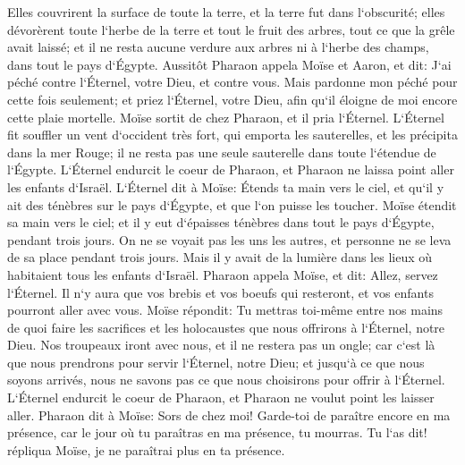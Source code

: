 \verse Elles couvrirent la surface de toute la terre, et la terre fut dans l`obscurité; elles dévorèrent toute l`herbe de la terre et tout le fruit des arbres, tout ce que la grêle avait laissé; et il ne resta aucune verdure aux arbres ni à l`herbe des champs, dans tout le pays d`Égypte. 
\verse Aussitôt Pharaon appela Moïse et Aaron, et dit: J`ai péché contre l`Éternel, votre Dieu, et contre vous. 
\verse Mais pardonne mon péché pour cette fois seulement; et priez l`Éternel, votre Dieu, afin qu`il éloigne de moi encore cette plaie mortelle. 
\verse Moïse sortit de chez Pharaon, et il pria l`Éternel. 
\verse L`Éternel fit souffler un vent d`occident très fort, qui emporta les sauterelles, et les précipita dans la mer Rouge; il ne resta pas une seule sauterelle dans toute l`étendue de l`Égypte. 
\verse L`Éternel endurcit le coeur de Pharaon, et Pharaon ne laissa point aller les enfants d`Israël. 
\verse L`Éternel dit à Moïse: Étends ta main vers le ciel, et qu`il y ait des ténèbres sur le pays d`Égypte, et que l`on puisse les toucher. 
\verse Moïse étendit sa main vers le ciel; et il y eut d`épaisses ténèbres dans tout le pays d`Égypte, pendant trois jours. 
\verse On ne se voyait pas les uns les autres, et personne ne se leva de sa place pendant trois jours. Mais il y avait de la lumière dans les lieux où habitaient tous les enfants d`Israël. 
\verse Pharaon appela Moïse, et dit: Allez, servez l`Éternel. Il n`y aura que vos brebis et vos boeufs qui resteront, et vos enfants pourront aller avec vous. 
\verse Moïse répondit: Tu mettras toi-même entre nos mains de quoi faire les sacrifices et les holocaustes que nous offrirons à l`Éternel, notre Dieu. 
\verse Nos troupeaux iront avec nous, et il ne restera pas un ongle; car c`est là que nous prendrons pour servir l`Éternel, notre Dieu; et jusqu`à ce que nous soyons arrivés, nous ne savons pas ce que nous choisirons pour offrir à l`Éternel. 
\verse L`Éternel endurcit le coeur de Pharaon, et Pharaon ne voulut point les laisser aller. 
\verse Pharaon dit à Moïse: Sors de chez moi! Garde-toi de paraître encore en ma présence, car le jour où tu paraîtras en ma présence, tu mourras. 
\verse Tu l`as dit! répliqua Moïse, je ne paraîtrai plus en ta présence. 


